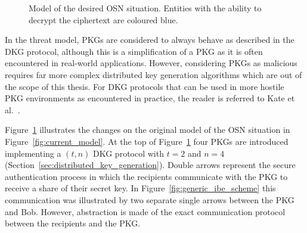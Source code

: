 \begin{figure}[ht]
\begin{center}
{
    }
    \end{center}
    \caption{Model of the desired OSN situation. Entities with the ability to decrypt the ciphertext are coloured blue.}
    \label{fig:new_model}
\end{figure}

In the threat model, PKGs are considered to always behave as described in the DKG protocol, although this is a simplification of a PKG as it is often encountered in real-world applications. However, considering PKGs as malicious requires far more complex distributed key generation algorithms which are out of the scope of this thesis. For DKG protocols that can be used in more hostile PKG environments as encountered in practice, the reader is referred to Kate et al.~\cite{art:KateHG12}.

Figure~\ref{fig:new_model} illustrates the changes on the original model of the OSN situation in Figure~\ref{fig:current_model}. At the top of Figure~\ref{fig:new_model} four PKGs are introduced implementing a $\left( t, n \right)$ DKG protocol with $t = 2$ and $n = 4$ (Section~\ref{sec:distributed_key_generation}). Double arrows represent the secure authentication process in which the recipients communicate with the PKG to receive a share of their secret key. In Figure~\ref{fig:generic_ibe_scheme} this communication was illustrated by two separate single arrows between the PKG and Bob. However, abstraction is made of the exact communication protocol between the recipients and the PKG.

